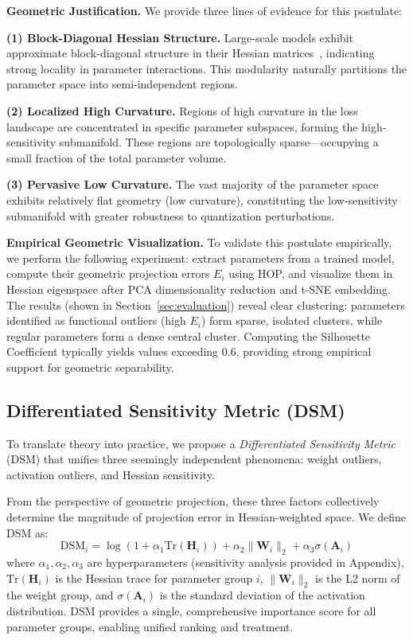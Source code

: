 \documentclass[letterpaper,twocolumn,10pt]{article}
\begin{document}
\textbf{Geometric Justification.} We provide three lines of evidence for this postulate:

\textbf{(1) Block-Diagonal Hessian Structure.} Large-scale models exhibit approximate block-diagonal structure in their Hessian matrices~\cite{frantar2022gptq}, indicating strong locality in parameter interactions. This modularity naturally partitions the parameter space into semi-independent regions.

\textbf{(2) Localized High Curvature.} Regions of high curvature in the loss landscape are concentrated in specific parameter subspaces, forming the high-sensitivity submanifold. These regions are topologically sparse---occupying a small fraction of the total parameter volume.

\textbf{(3) Pervasive Low Curvature.} The vast majority of the parameter space exhibits relatively flat geometry (low curvature), constituting the low-sensitivity submanifold with greater robustness to quantization perturbations.

\textbf{Empirical Geometric Visualization.} To validate this postulate empirically, we perform the following experiment: extract parameters from a trained model, compute their geometric projection errors $E_i$ using HOP, and visualize them in Hessian eigenspace after PCA dimensionality reduction and t-SNE embedding. The results (shown in Section~\ref{sec:evaluation}) reveal clear clustering: parameters identified as functional outliers (high $E_i$) form sparse, isolated clusters, while regular parameters form a dense central cluster. Computing the Silhouette Coefficient typically yields values exceeding 0.6, providing strong empirical support for geometric separability.

\subsection{Differentiated Sensitivity Metric (DSM)}

To translate theory into practice, we propose a \emph{Differentiated Sensitivity Metric} (DSM) that unifies three seemingly independent phenomena: weight outliers, activation outliers, and Hessian sensitivity.

From the perspective of geometric projection, these three factors collectively determine the magnitude of projection error in Hessian-weighted space. We define DSM as:
\begin{equation}
\text{DSM}_i = \log(1 + \alpha_1 \text{Tr}(\mathbf{H}_i)) + \alpha_2 \|\mathbf{W}_i\|_2 + \alpha_3 \sigma(\mathbf{A}_i)
\label{eq:dsm}
\end{equation}
where $\alpha_1, \alpha_2, \alpha_3$ are hyperparameters (sensitivity analysis provided in Appendix), $\text{Tr}(\mathbf{H}_i)$ is the Hessian trace for parameter group $i$, $\|\mathbf{W}_i\|_2$ is the L2 norm of the weight group, and $\sigma(\mathbf{A}_i)$ is the standard deviation of the activation distribution. DSM provides a single, comprehensive importance score for all parameter groups, enabling unified ranking and treatment.
\end{document}
